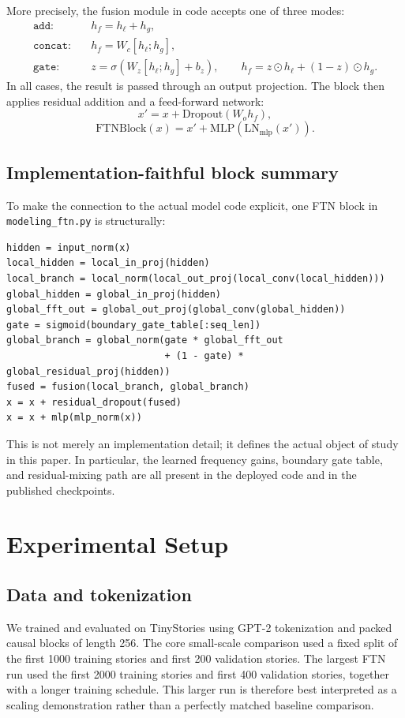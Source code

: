 \documentclass[11pt]{article}
\begin{document}
More precisely, the fusion module in code accepts one of three modes:
\begin{align}
    \texttt{add}: \quad & h_f = h_{\ell} + h_g, \\
    \texttt{concat}: \quad & h_f = W_c [h_{\ell}; h_g], \\
    \texttt{gate}: \quad & z = \sigma\!\left(W_z [h_{\ell}; h_g] + b_z\right), \qquad
    h_f = z \odot h_{\ell} + (1-z)\odot h_g.
\end{align}
In all cases, the result is passed through an output projection. The block then applies residual addition and a feed-forward network:
\begin{equation}
    x' = x + \mathrm{Dropout}(W_o h_f),
\end{equation}
\begin{equation}
    \mathrm{FTNBlock}(x) = x' + \mathrm{MLP}(\mathrm{LN}_{\mathrm{mlp}}(x')).
\end{equation}

\subsection{Implementation-faithful block summary}
To make the connection to the actual model code explicit, one FTN block in \texttt{modeling\_ftn.py} is structurally:
\begin{verbatim}
hidden = input_norm(x)
local_hidden = local_in_proj(hidden)
local_branch = local_norm(local_out_proj(local_conv(local_hidden)))
global_hidden = global_in_proj(hidden)
global_fft_out = global_out_proj(global_conv(global_hidden))
gate = sigmoid(boundary_gate_table[:seq_len])
global_branch = global_norm(gate * global_fft_out
                            + (1 - gate) * global_residual_proj(hidden))
fused = fusion(local_branch, global_branch)
x = x + residual_dropout(fused)
x = x + mlp(mlp_norm(x))
\end{verbatim}
This is not merely an implementation detail; it defines the actual object of study in this paper. In particular, the learned frequency gains, boundary gate table, and residual-mixing path are all present in the deployed code and in the published checkpoints.

\section{Experimental Setup}
\subsection{Data and tokenization}
We trained and evaluated on TinyStories using GPT-2 tokenization and packed causal blocks of length 256. The core small-scale comparison used a fixed split of the first 1000 training stories and first 200 validation stories. The largest FTN run used the first 2000 training stories and first 400 validation stories, together with a longer training schedule. This larger run is therefore best interpreted as a scaling demonstration rather than a perfectly matched baseline comparison.
\end{document}

